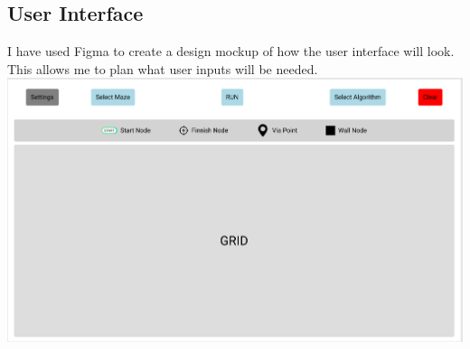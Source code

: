 \documentclass{article}
\newcommand{\comment}[1]{}
\begin{document}
\comment{
\begin{tikzpicture}[node distance = 2cm, auto]
    \node[start] (init) {start};
    \node [io, below of = init] (1) {User selects maze algorithm};
    \node[block, below of = 1] (2) {Generate maze using selected algorithm};
    \node [io, below of=2](3){User selects path finding algorithm};
    \node[decision, below of=3](4){Start button pressed?};
    \node[block, below of=4, yshift=-1cm](5){Visualization runs};
    \node[decision, below of=5](6){Reset button pressed?};
    \node[decision, right of=6, xshift=1cm](7){Nodes moved?};
    \node[block, below of=7, xshift=0.25cm, yshift=-0.5cm](8){Update visualization};
    \node[block, below of=6, yshift=-0.5cm](9){Visualization resets};

    \path[line] (init) -- (1);
    \path[line] (1) -- (2);
    \path[line] (2) -- (3);
    \path[line] (3) -- (4);
    \path[line] (4) -- node {no}(4);
    \path[line] (4) -- node {yes}(5);
    \path[line] (5) -- (6);
    \path[line] (6) -- node {no}(7);
    \path[line] (6) -- node {yes}(9);
    \path[line] (7) -- node {yes}(8);
    \path[line] (7) -- node {no}(6);
    \path[line] (8) -- (6);
    \path[line, anchor=west] (9) -- (init);
\end{tikzpicture}}

\subsection{User Interface}
I have used Figma to create a design mockup of how the user interface will look. This allows me to plan what user inputs will be needed.
\newline
\includegraphics[width=\linewidth]{assets/gui.PNG}
\end{document}
